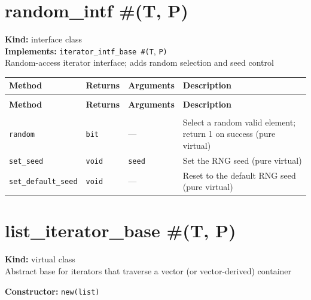 \documentclass[11pt,letterpaper]{report}
\begin{document}
\section{random\_intf \#(T, P)}
\label{cls:randomintfTP}

\noindent\textbf{Kind:} interface class\\
\noindent\textbf{Implements:} \texttt{iterator\_intf\_base \#(T}, \texttt{P)}\\
\noindent Random-access iterator interface; adds random selection and seed control

\begin{xltabular}{\linewidth}{>{\small}p{1.35in} >{\small}p{1.25in} >{\small}p{0.95in} >{\small}X}
\toprule
\textbf{Method} & \textbf{Returns} & \textbf{Arguments} & \textbf{Description} \\
\midrule
\endfirsthead
{} \\
\midrule
\textbf{Method} & \textbf{Returns} & \textbf{Arguments} & \textbf{Description} \\
\midrule
\endhead
\midrule
{} \\
\endfoot
\bottomrule
\endlastfoot
\texttt{random} & \texttt{bit} & --- & Select a random valid element; return 1 on success (pure virtual) \\
\texttt{set\_seed} & \texttt{void} & \texttt{seed} & Set the RNG seed (pure virtual) \\
\texttt{set\_default\_seed} & \texttt{void} & --- & Reset to the default RNG seed (pure virtual) \\
\end{xltabular}

\section{list\_iterator\_base \#(T, P)}
\label{cls:listiteratorbaseTP}

\noindent\textbf{Kind:} virtual class\\
\noindent Abstract base for iterators that traverse a vector (or vector-derived) container

\noindent\textbf{Constructor:} \texttt{new(list)}
\end{document}
